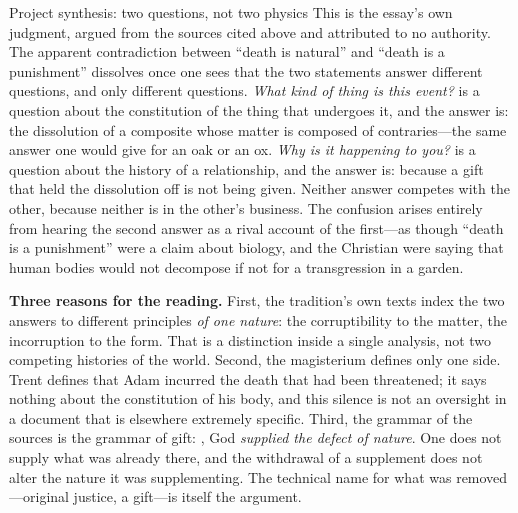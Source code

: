 \begin{studybox}{Project synthesis: two questions, not two physics}
This is the essay's own judgment, argued from the sources cited above and attributed to no authority. The apparent contradiction between ``death is natural'' and ``death is a punishment'' dissolves once one sees that the two statements answer different questions, and only different questions. \emph{What kind of thing is this event?} is a question about the constitution of the thing that undergoes it, and the answer is: the dissolution of a composite whose matter is composed of contraries---the same answer one would give for an oak or an ox. \emph{Why is it happening to you?} is a question about the history of a relationship, and the answer is: because a gift that held the dissolution off is not being given. Neither answer competes with the other, because neither is in the other's business. The confusion arises entirely from hearing the second answer as a rival account of the first---as though ``death is a punishment'' were a claim about biology, and the Christian were saying that human bodies would not decompose if not for a transgression in a garden.

\medskip\noindent\textbf{Three reasons for the reading.} First, the tradition's own texts index the two answers to different principles \emph{of one nature}: the corruptibility to the matter, the incorruption to the form. That is a distinction inside a single analysis, not two competing histories of the world. Second, the magisterium defines only one side. Trent defines that Adam incurred the death that had been threatened; it says nothing about the constitution of his body, and this silence is not an oversight in a document that is elsewhere extremely specific. Third, the grammar of the sources is the grammar of gift: , God \emph{supplied the defect of nature}. One does not supply what was already there, and the withdrawal of a supplement does not alter the nature it was supplementing. The technical name for what was removed---original justice, a gift---is itself the argument.


\end{studybox}
